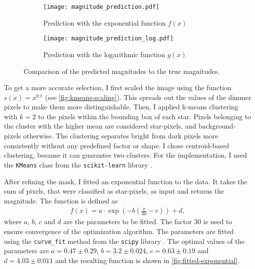\begin{figure}[tb]
  \centering
  \begin{subfigure}{.49\textwidth}
    \centering
    \texttt{[image: magnitude\_prediction.pdf]}
    \caption{Prediction with the exponential function $f(x)$}
    \label{fig:prediction-exponential}
  \end{subfigure}%
  \hfill
  \begin{subfigure}{.49\textwidth}
    \centering
    \texttt{[image: magnitude\_prediction\_log.pdf]}
    \caption{Prediction with the logarithmic function $g(x)$}
    \label{fig:prediction-logarithmic}
  \end{subfigure}
  \caption{Comparison of the predicted magnitudes to the true magnitudes.}
  \label{fig:prediction}
\end{figure}

To get a more accurate selection, I first scaled the image using the function $s(x) =
  x^{0.1}$ (see \autoref{fig:kmeans-scaling}). This spreads out the values of the dimmer
pixels to make them more distinguishable. Then, I applied k-means clustering with $k =
  2$ to the pixels within the bounding box of each star. Pixels belonging to the cluster
with the higher mean are considered star-pixels, and background-pixels otherwise. The
clustering separates bright from dark pixels more consistently without any predefined
factor or shape. I chose centroid-based clustering, because it can guarantee two
clusters. For the implementation, I used the \texttt{KMeans} class from the
\texttt{scikit-learn} library \cite{scikit-learn}.

After refining the mask, I fitted an exponential function to the data. It takes the sum of
pixels, that were classified as star-pixels, as input and returns the magnitude. The
function is defined as
\begin{align*}
  f(x) = a \cdot \exp{\left(-b \left(\frac{x}{30} - c\right)\right)} + d,
\end{align*}
where $a$, $b$, $c$ and $d$ are the parameters to be fitted. The factor $30$ is used to
ensure convergence of the optimization algorithm. The parameters are fitted using the
\texttt{curve\_fit} method from the \texttt{scipy} library \cite{scipy2020}. The optimal
values of the parameters are $a = 0.47 \pm 0.29$, $b = 3.2 \pm 0.024$, $c = 0.63 \pm 0.19$
and $d = 4.03 \pm 0.011$ and the resulting function is shown in
\autoref{fig:fitted-exponential}.

